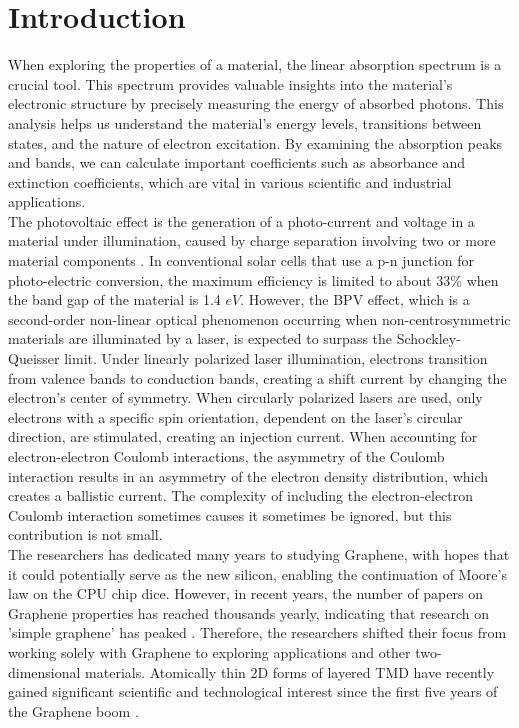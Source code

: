 \documentclass[12pt,english,a4paper]{article}
\begin{document}
	\section{Introduction}
\quad When exploring the properties of a material, the linear absorption spectrum is a crucial tool. This spectrum provides valuable insights into the material's electronic structure by precisely measuring the energy of absorbed photons. This analysis helps us understand the material's energy levels, transitions between states, and the nature of electron excitation. By examining the absorption peaks and bands, we can calculate important coefficients such as absorbance and extinction coefficients, which are vital in various scientific and industrial applications.\\\null
\quad The photovoltaic effect is the generation of a photo-current and voltage in a material under illumination, caused by charge separation involving two or more material components \cite{jiang_flexo-photovoltaic_2021}. In conventional solar cells that use a p-n junction for photo-electric conversion, the maximum efficiency is limited to about 33\% when the band gap of the material is 1.4 \(eV\)\cite{shockley_detailed_1961}. However, the \ac{BPV} effect, which is a second-order non-linear optical phenomenon occurring when non-centrosymmetric materials are illuminated by a laser, is expected to surpass the Schockley-Queisser limit. Under linearly polarized laser illumination, electrons transition from valence bands to conduction bands, creating a shift current by changing the electron's center of symmetry. When circularly polarized lasers are used, only electrons with a specific spin orientation, dependent on the laser's circular direction, are stimulated, creating an injection current. When accounting for electron-electron Coulomb interactions, the asymmetry of the Coulomb interaction results in an asymmetry of the electron density distribution, which creates a ballistic current. The complexity of including the electron-electron Coulomb interaction sometimes causes it sometimes be ignored, but this contribution is not small\cite{sturman_ballistic_2020}.\\\null
\quad  The researchers has dedicated many years to studying Graphene, with hopes that it could potentially serve as the new silicon, enabling the continuation of Moore's law on the CPU chip dice. However, in recent years, the number of papers on Graphene properties has reached thousands yearly, indicating that research on 'simple graphene' has peaked \cite{geim_van_2013}. Therefore, the researchers shifted their focus from working solely with Graphene to exploring applications and other two-dimensional materials. Atomically thin \ac{2D} forms of layered TMD have recently gained significant scientific and technological interest since the first five years of the Graphene boom \cite{wang_electronics_2012,geim_van_2013}.\\\null
\end{document}
